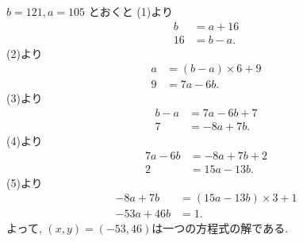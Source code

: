 \begin{enumerate}[6.1]
\begin{enumerate}[(a)]
    $b = 121, a = 105$ とおくと (1)より
    \begin{align*}
      b  & = a + 16 \\
      16 & = b - a.
    \end{align*}
    (2)より
    \begin{align*}
      a &= (b - a) \times 6 + 9 \\
      9 &= 7a - 6b.
    \end{align*}
    (3)より
    \begin{align*}
      b - a &= 7a - 6b + 7 \\
      7 &= -8a + 7b.
    \end{align*}
    (4)より
    \begin{align*}
      7a - 6b &= -8a + 7b + 2 \\
      2 &= 15a - 13b.
    \end{align*}
    (5)より
    \begin{align*}
      -8a + 7b &= (15a - 13b) \times 3 + 1 \\
      -53a + 46b &= 1.
    \end{align*}
    よって, $(x, y) = (-53, 46)$は一つの方程式の解である.


\end{enumerate}
\end{enumerate}
